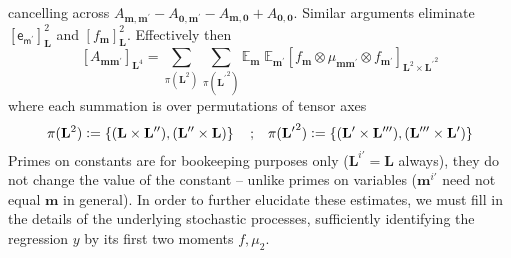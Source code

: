 \documentclass[preprint,12pt]{elsarticle}
\newcommand*{\M}[1]{\ensuremath{#1}\xspace}
\newcommand*{\x}{\times}
\newcommand*{\mi}[1]{\mathbf{#1}}
\newcommand*{\rv}[1]{\mathsf{#1}}
\newcommand*{\te}[2][]{\left\lbrack{#2}\right\rbrack_{#1}}
\newcommand*{\deq}{\M{\mathrel{\mathop:}=}}
\newcommand{\T}[1]{\text{#1}}
\newcommand*{\QT}[2][]{\M{\quad\T{#2}\ifthenelse{\equal{#1}{}}{\quad}{#1}}}
\newcommand*{\evt}[3][]{\mathbb{E}_{#3}^{#1}\!#2}
\newcommand*{\set}[1]{\M{\left\lbrace{#1}\right\rbrace}}
\begin{document}
    cancelling across $A_{\mi{m,m^{\prime}}}-A_{\mi{0,m^{\prime}}} - A_{\mi{m,0}}+A_{\mi{0,0}}$.
    Similar arguments eliminate $\te[\mi{L}]{\rv{e_{m^{\prime}}}}^{2}$ and $\te[\mi{L}]{f_\mi{m}}^{2}$.
    Effectively then
    \begin{equation}
        \te[\mi{L}^4]{A_{\mi{mm^{\prime}}}} = \sum_{\pi(\mi{L}^{2})} \sum_{\pi(\mi{L^{\prime}}^{2})}
        \evt{\;\evt{\te[\mi{L}^{2} \x \mi{L^{\prime}}^{2}]{f_{\mi{m}} \otimes \mu_{\mi{mm^{\prime}}} \otimes f_{\mi{m^{\prime}}}}}{\mi{m^{\prime}}}}{\mi{m}}
    \end{equation}
    where each summation is over permutations of tensor axes
    \begin{equation*}
        \pi(\mi{L}^{2}) \deq \set{(\mi{L}\x\mi{L^{\prime\prime}}), (\mi{L^{\prime\prime}}\x\mi{L})} \QT{;} \pi(\mi{L^{\prime}}^{2}) \deq \set{(\mi{L^{\prime}}\x\mi{L^{\prime\prime\prime}}), (\mi{L^{\prime\prime\prime}}\x\mi{L^{\prime}})}
    \end{equation*}
    Primes on constants are for bookeeping purposes only ($\mi{L}^{i\prime} = \mi{L}$ always), they do not change the value of the constant -- unlike primes on variables ($\mi{m}^{i\prime}$ need not equal $\mi{m}$ in general).
    In order to further elucidate these estimates, we must fill in the details of the underlying stochastic processes, sufficiently identifying the regression $y$ by its first two moments $f, \mu_{2}$.
\end{document}
